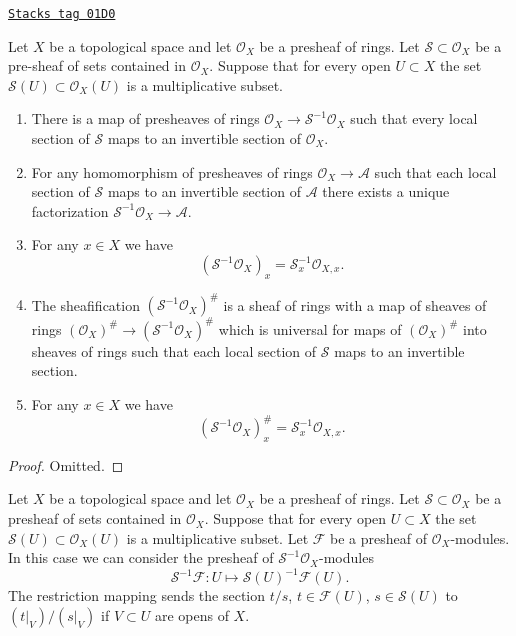 \begin{lemma}
\label{modules-lemma-simple-invert}
\href{https://stacks.math.columbia.edu/tag/01D0}{\texttt{Stacks tag 01D0}}

Let $X$ be a topological space and let $\mathcal{O}_X$ be a
presheaf of rings. Let $\mathcal{S} \subset \mathcal{O}_X$
be a pre-sheaf of sets contained in $\mathcal{O}_X$.
Suppose that for every open $U \subset X$ the set
$\mathcal{S}(U) \subset \mathcal{O}_X(U)$ is a multiplicative subset.
\begin{enumerate}
\item There is a map of presheaves of rings
$\mathcal{O}_X \to \mathcal{S}^{-1}\mathcal{O}_X$
such that every local section of $\mathcal{S}$ maps to an invertible
section of $\mathcal{O}_X$.
\item For any homomorphism of presheaves of rings
$\mathcal{O}_X \to \mathcal{A}$ such that each local section
of $\mathcal{S}$ maps to an invertible section of $\mathcal{A}$
there exists a unique factorization
$\mathcal{S}^{-1}\mathcal{O}_X \to \mathcal{A}$.
\item For any $x \in X$ we have
$$
(\mathcal{S}^{-1}\mathcal{O}_X)_x = \mathcal{S}_x^{-1} \mathcal{O}_{X, x}.
$$
\item The sheafification $(\mathcal{S}^{-1}\mathcal{O}_X)^\#$ is a sheaf
of rings with a map of sheaves of rings
$(\mathcal{O}_X)^\# \to (\mathcal{S}^{-1}\mathcal{O}_X)^\#$
which is universal for maps of $(\mathcal{O}_X)^\#$ into sheaves
of rings such that each local section of $\mathcal{S}$ maps
to an invertible section.
\item For any $x \in X$ we have
$$
(\mathcal{S}^{-1}\mathcal{O}_X)^\#_x = \mathcal{S}_x^{-1} \mathcal{O}_{X, x}.
$$
\end{enumerate}
\end{lemma}

\begin{proof}
Omitted.
\end{proof}

Let $X$ be a topological space and let $\mathcal{O}_X$ be a
presheaf of rings. Let $\mathcal{S} \subset \mathcal{O}_X$
be a presheaf of sets contained in $\mathcal{O}_X$.
Suppose that for every open $U \subset X$ the set
$\mathcal{S}(U) \subset \mathcal{O}_X(U)$ is a multiplicative subset.
Let $\mathcal{F}$ be a presheaf of $\mathcal{O}_X$-modules.
In this case we can consider the presheaf of
$\mathcal{S}^{-1}\mathcal{O}_X$-modules
$$
\mathcal{S}^{-1}\mathcal{F} :
U \longmapsto \mathcal{S}(U)^{-1}\mathcal{F}(U).
$$
The restriction mapping sends the section $t/s$, $t \in \mathcal{F}(U)$,
$s \in \mathcal{S}(U)$ to $(t|_V)/(s|_V)$ if $V \subset U$ are opens
of $X$.

